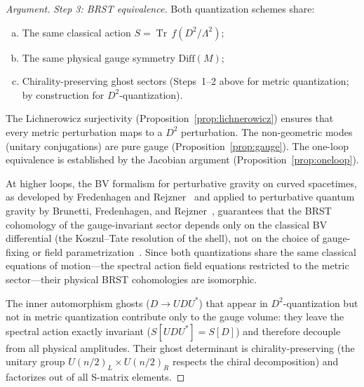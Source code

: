 \documentclass[12pt,a4paper]{article}
\theoremstyle{definition}
\theoremstyle{remark}
\newcommand{\Tr}{\operatorname{Tr}}
\newcommand{\Lam}{\Lambda}
\begin{document}
\begin{proof}[Argument]
\smallskip\noindent\emph{Step 3: BRST equivalence.}
Both quantization schemes share:
\begin{enumerate}[(a)]
  \item The same classical action $S = \Tr\,f(D^2/\Lam^2)$;
  \item The same physical gauge symmetry $\mathrm{Diff}(M)$;
  \item Chirality-preserving ghost sectors (Steps~1--2 above for metric
        quantization; by construction for $D^2$-quantization).
\end{enumerate}
The Lichnerowicz surjectivity (Proposition~\ref{prop:lichnerowicz})
ensures that every metric perturbation maps to a $D^2$ perturbation.
The non-geometric modes (unitary conjugations) are pure gauge
(Proposition~\ref{prop:gauge}).  The one-loop equivalence is established
by the Jacobian argument (Proposition~\ref{prop:oneloop}).

At higher loops, the BV formalism for perturbative gravity on curved
spacetimes, as developed by Fredenhagen and
Rejzner~\cite{Fredenhagen:2011bv,Fredenhagen:2012classical} and applied
to perturbative quantum gravity by Brunetti, Fredenhagen, and
Rejzner~\cite{Brunetti:2013pqg}, guarantees that the BRST cohomology
of the gauge-invariant sector depends only on the classical
BV differential (the Koszul--Tate resolution of the shell), not on the
choice of gauge-fixing or field parametrization~\cite{Rejzner:2016book}.
Since both quantizations share the same classical equations of
motion---the spectral action field equations restricted to the metric
sector---their physical BRST cohomologies are isomorphic.

The inner automorphism ghosts ($D \to UDU^*$) that appear in
$D^2$-quantization but not in metric quantization contribute only to
the gauge volume: they leave the spectral action exactly invariant
($S[UDU^*] = S[D]$) and therefore decouple from all physical amplitudes.
Their ghost determinant is chirality-preserving (the unitary group
$U(n/2)_L \times U(n/2)_R$ respects the chiral decomposition) and
factorizes out of all S-matrix elements.
\end{proof}
\end{document}
